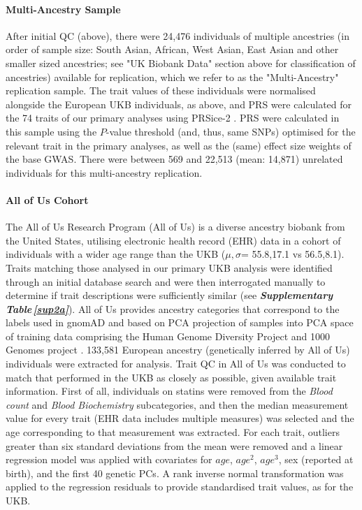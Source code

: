\documentclass[12pt]{zHenriquesLab-StyleBioRxiv}
\newcommand\stref[1]{\normalsize{\textbf{\textit{Supplementary Table\,\ref{#1}}}}\normalsize{}}
\begin{document}
{{\paragraph*{Multi-Ancestry Sample}
After initial QC (above), there were 24,476 individuals of multiple ancestries (in order of sample size: South Asian, African, West Asian, East Asian and other smaller sized ancestries; see "UK Biobank Data" section above for classification of ancestries) 
available for replication, which we refer to as the "Multi-Ancestry" replication sample. The trait values of 
these individuals were normalised alongside the European UKB individuals, as above, and PRS 
were calculated for the 74 traits of our primary analyses using PRSice-2 \cite{prsice}. 
PRS were calculated in this sample using the $P$-value threshold (and, thus, same SNPs) 
optimised for the relevant trait in the primary analyses, as well as the (same) effect 
size weights of the base GWAS. There were between 569 and 22,513 (mean: 14,871) unrelated 
individuals for this multi-ancestry replication. 

\paragraph*{All of Us Cohort}
The All of Us Research Program (All of Us) is a diverse ancestry biobank from the United States, utilising 
electronic health record (EHR) data in a cohort of individuals with a wider age 
range than the UKB ($\mu,\sigma$= 55.8,17.1 vs 56.5,8.1). 
Traits matching those analysed in our primary UKB analysis 
were identified through an initial database search and were 
then interrogated manually to determine if trait descriptions 
were sufficiently similar (see \stref{sup2a}).  
All of Us provides ancestry categories that correspond to the 
labels used in gnomAD \cite{gnomad} and based on PCA projection 
of samples into PCA space of training data comprising the Human Genome 
Diversity Project \cite{hgdp} and 1000 Genomes project \cite{tgp}.  
133,581  European ancestry (genetically inferred by All of Us) individuals were extracted for analysis. 
Trait QC in All of Us was conducted to match that performed in the UKB as closely as possible, given 
available trait information. First of all, individuals on statins were removed 
from the \textit{Blood count} and \textit{Blood Biochemistry} subcategories, and then the 
median measurement value for every trait (EHR data includes multiple measures) was selected and 
the age corresponding to that measurement was extracted. For each trait, outliers greater 
than six standard deviations from the mean were removed and a linear regression model was 
applied with covariates for $age$, $age^2$, $age^3$, sex (reported at birth), and the first 40 genetic PCs. 
A rank inverse normal transformation was applied to the regression residuals to provide standardised trait values, as for the UKB.

}}
\end{document}
